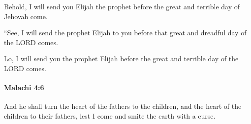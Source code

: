 			\begin{versebox}
					\item[BHS] 
					\item[LXX] 
					\item[ASV] Behold, I will send you Elijah the prophet before the great and terrible day of Jehovah come.
					\item[NIV] “See, I will send the prophet Elijah to you before that great and dreadful day of the LORD comes.
					\item[NRSV] Lo, I will send you the prophet Elijah before the great and terrible day of the LORD comes.
			\end{versebox}

		\paragraph{Malachi 4:6} %
			\label{MALACHI-4-6}

			And he shall turn the heart of the fathers to the children, and the heart of the children to their fathers, lest I come and smite the earth with a curse.

